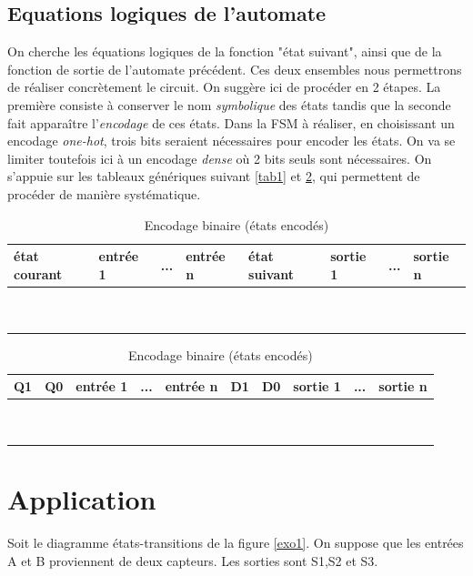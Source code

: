 \documentclass[a4paper,11pt]{article}
\begin{document}
\subsection{Equations logiques de l'automate}
On cherche les équations logiques de la fonction "état suivant", ainsi que de la fonction de sortie de l'automate précédent. Ces deux ensembles
nous permettrons de réaliser concrètement le circuit. On suggère ici de procéder en 2 étapes.
La première consiste à conserver le nom {\it symbolique} des états tandis que la seconde fait apparaître l'{\it encodage} de ces états.
Dans la FSM à réaliser, en choisissant un encodage {\it one-hot}, trois bits seraient nécessaires pour encoder les états.
On va se limiter toutefois ici à un encodage {\it dense} où 2 bits seuls sont nécessaires. On s'appuie sur les tableaux génériques suivant \ref{tab1} et \ref{tab2},
qui permettent de procéder de manière systématique.
\begin{table}[htp]

  \centering
  \caption{Encodage symbolique (nom des états préservés)}\label{tab1}

  \begin{tabular}{|l|l|l|l||l|l|l|l|}
      \hline
      état courant & entrée 1 & ... & entrée n &  état suivant & sortie 1 & ... & sortie n \\ \hline
      ~        & ~    & ~         & ~            & ~            & ~        & ~   & ~        \\
      ~        & ~   & ~     & ~            & ~            & ~        & ~   & ~        \\
      \hline
  \end{tabular}

  \bigskip

  \caption{Encodage binaire (états encodés)}\label{tab2}

  \begin{tabular}{|l|l|l|l||l|l|l|l|l|l|}
    \hline
    Q1 & Q0 &  entrée 1 & ... & entrée n & D1 & D0 & sortie 1 & ... & sortie n \\ \hline
    ~        & ~  & ~  & ~  & ~  & ~  & ~  & ~        & ~   & ~        \\
    ~        & ~  & ~  & ~  & ~  & ~  & ~  & ~        & ~   & ~        \\
    \hline
  \end{tabular}

\end{table}



\section{Application}
Soit le diagramme états-transitions de la figure \ref{exo1}. On suppose que les entrées A et B proviennent de deux capteurs.
Les sorties sont S1,S2 et S3.
\end{document}
